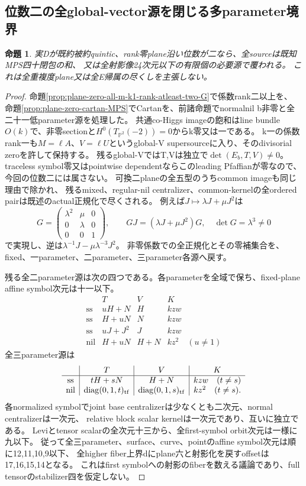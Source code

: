 \documentclass[a4paper,11pt]{ltjsarticle}
\newtheorem{proposition}{命題}[section]
\theoremstyle{definition}
\begin{document}
\subsection{位数二の全global-vector源を閉じる多parameter境界}
\begin{proposition}\label{prop:plane-m2-complete-G}
実Dが既約被約quintic、rank零plane沿い位数が二なら、全sourceは既知MPS四十閉包の和、
又は全射影像24次元以下の有限個の必要源で覆われる。
これは全重複度plane又は全E帰属の尽くしを主張しない。
\end{proposition}
\begin{proof}
命題\ref{prop:plane-zero-all-m-k1-rank-atleast-two-G}で係数rank二以上を、
命題\ref{prop:plane-zero-cartan-MPS}でCartanを、前諸命題でnormalnil b非零と全二十一低parameter源を処理した。
共通co-Higgs imageの飽和はline bundle$O(k)$で、非零sectionと$H^0(T_{\mathbb P^2}(-2))=0$からk零又は一である。
k一の係数rank一も$M=\ell A$、$V=\ell U$というglobal-V supersourceに入り、そのdivisorial zeroを許して保持する。
残るglobal-VではT,Vは独立で$\det(E_b,T,V)\ne0$。
traceless symbol零又はpointwise dependentならこのleading Pfaffianが零なので、今回の位数二には属さない。
可換二planeの全五型のうちcommon imageも同じ理由で除かれ、
残るmixed、regular-nil centralizer、common-kernelの全ordered pairは既述のactual正規化で尽くされる。
例えば$J\mapsto\lambda J+\mu J^2$は
\[
 G=\begin{pmatrix}\lambda^2&\mu&0\\0&\lambda&0\\0&0&1\end{pmatrix},
 \qquad GJ=(\lambda J+\mu J^2)G,\quad\det G=\lambda^3\ne0
\]
で実現し、逆は$\lambda^{-1}J-\mu\lambda^{-3}J^2$。
非零係数での全正規化とその零補集合を、fixed、一parameter、二parameter、三parameter各源へ戻す。

残る全二parameter源は次の四つである。各parameterを全域で保ち、fixed-plane affine symbol次元は十一以下。
\[
\begin{array}{c|c|c|c}
 &T&V&K\\\hline
 \mathrm{ss}&uH+N&H&kzw\\
 \mathrm{ss}&H+uN&N&kzw\\
 \mathrm{ss}&uJ+J^2&J&kzw\\
 \mathrm{nil}&H+uN&H+N&kz^2\quad(u\ne1)
\end{array}
\]
全三parameter源は
\[
\begin{array}{c|c|c|c}
 &T&V&K\\\hline
 \mathrm{ss}&tH+sN&H+N&kzw\quad(t\ne s)\\
 \mathrm{nil}&\operatorname{diag}(0,1,t)_{\rm tf}&
 \operatorname{diag}(0,1,s)_{\rm tf}&kz^2\quad(t\ne s).
\end{array}
\]
各normalized symbolでjoint base centralizerは少なくとも二次元、normal centralizerは一次元、
relative block scalar kernelは一次元であり、互いに独立である。
Leviとtensor scalarの全次元十三から、全first-symbol orbit次元は一様に九以下。
従って全三parameter、surface、curve、pointのaffine symbol次元は順に12,11,10,9以下、
全higher fiber上界dにplane六と射影化を戻すoffsetは17,16,15,14となる。
これはfirst symbolへの射影のfiberを数える議論であり、full tensorのstabilizer四を仮定しない。


\end{proof}
\end{document}
